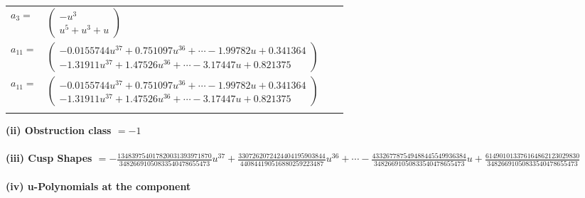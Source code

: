 \documentclass[1p]{elsarticle_modified}
\theoremstyle{definition}
\begin{document}
\begin{tabular}{m{7pt} m{180pt} m{7pt} m{180pt} }
\flushright $a_{3}=$&$\begin{pmatrix}- u^3\\u^5+u^3+u\end{pmatrix}$ \\
\flushright $a_{11}=$&$\begin{pmatrix}-0.0155744 u^{37}+0.751097 u^{36}+\cdots-1.99782 u+0.341364\\-1.31911 u^{37}+1.47526 u^{36}+\cdots-3.17447 u+0.821375\end{pmatrix}$\\ \flushright $a_{11}=$&$\begin{pmatrix}-0.0155744 u^{37}+0.751097 u^{36}+\cdots-1.99782 u+0.341364\\-1.31911 u^{37}+1.47526 u^{36}+\cdots-3.17447 u+0.821375\end{pmatrix}$\\&\end{tabular}
\flushleft \textbf{(ii) Obstruction class $= -1$}\\~\\
\flushleft \textbf{(iii) Cusp Shapes $= -\frac{134839754017820031393971870}{34826691050833540478655473} u^{37}+\frac{3307262072424404195903844}{440844190516880259223487} u^{36}+\cdots-\frac{433267787549488445549936384}{34826691050833540478655473} u+\frac{614901013376164862123029830}{34826691050833540478655473}$}\\~\\
\newpage\renewcommand{\arraystretch}{1}
\flushleft \textbf{(iv) u-Polynomials at the component}\newline \\
\end{document}
